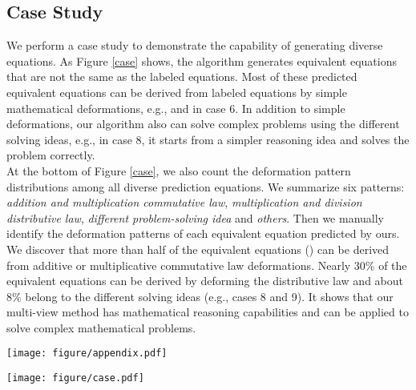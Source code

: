 \documentclass[11pt]{article}
\begin{document}
\subsection{Case Study} We perform a case study to demonstrate the capability of generating diverse equations. As Figure \ref{case} shows, the algorithm generates equivalent equations that are not the same as the labeled equations. 
Most of these predicted equivalent equations can be derived from labeled equations by simple mathematical deformations, e.g.,  and  in case 6. In addition to simple deformations, our algorithm also can solve complex problems using the different solving ideas, e.g., in case 8, it starts from a simpler reasoning idea and solves the problem correctly.\\ 
\indent At the bottom of Figure \ref{case}, we also count the deformation pattern distributions among all diverse prediction equations. We summarize six patterns: \emph{addition and multiplication commutative law}, \emph{multiplication and division distributive law}, \emph{different problem-solving idea} and \emph{others}. Then we manually identify the deformation patterns of each equivalent equation predicted by ours. We discover that more than half of the equivalent equations () can be derived from additive or multiplicative commutative law deformations. Nearly 30\% of the equivalent equations can be derived by deforming the distributive law and about 8\% belong to the different solving ideas (e.g., cases 8 and 9). It shows that our multi-view method has mathematical reasoning capabilities and can be applied to solve complex mathematical problems. 
\begin{figure*}[hb]
\begin{center}
\texttt{[image: figure/appendix.pdf]}
\end{center}
\caption{A MathQA example of multi-view reasoning and consistent contrastive learning process. It contains independent reasoning processes of two views, the computations of sub-expressions representation, and multi-granularity alignment.}
\label{Fig.appendix} \end{figure*}
\begin{figure*}[hb]
\begin{center}
\texttt{[image: figure/case.pdf]}
\end{center}
\caption{Nine examples demonstrate the capability of our approach for generating equivalent but non-labeled equations. At the bottom, we count the distribution of the six generation patterns among all equivalent equations. Each pattern represents a mathematical deformation using a specific mathematical law. This diverse generation indicates that our model can understands the underlying mathematical relation and generates reasonable equation based on mathematical laws.}
\label{case}
\end{figure*}
\end{document}

